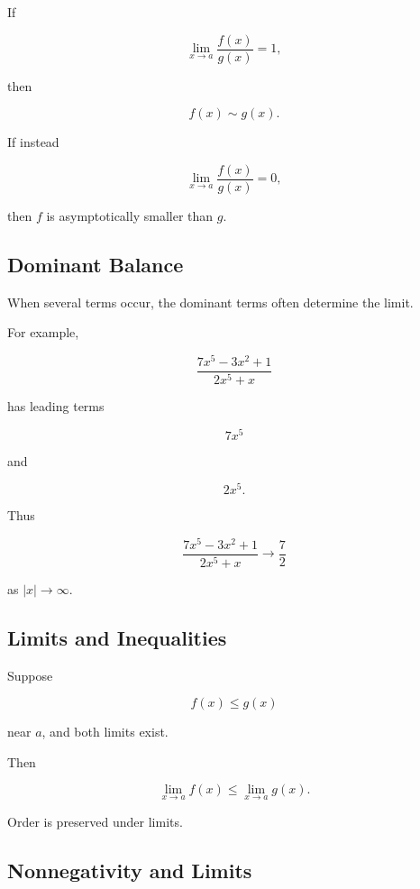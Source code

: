 If

\[
\boxed{
\lim_{x\to a}
\frac{f(x)}{g(x)}
=
1,
}
\]

then

\[
\boxed{
f(x)\sim g(x).
}
\]

If instead

\[
\boxed{
\lim_{x\to a}
\frac{f(x)}{g(x)}
=
0,
}
\]

then \(f\) is asymptotically smaller than \(g\).

\subsection{Dominant Balance}
\label{subsec:dominant-balance-reference}

When several terms occur, the dominant terms often determine the limit.

For example,

\[
\frac{
7x^5-3x^2+1
}{
2x^5+x
}
\]

has leading terms

\[
7x^5
\]

and

\[
2x^5.
\]

Thus

\[
\boxed{
\frac{
7x^5-3x^2+1
}{
2x^5+x
}
\to
\frac72
}
\]

as \(|x|\to\infty\).

\subsection{Limits and Inequalities}
\label{subsec:limits-and-inequalities}

Suppose

\[
f(x)\leq g(x)
\]

near \(a\), and both limits exist.

Then

\[
\boxed{
\lim_{x\to a}f(x)
\leq
\lim_{x\to a}g(x).
}
\]

Order is preserved under limits.

\subsection{Nonnegativity and Limits}
\label{subsec:nonnegative-limit-rule}

